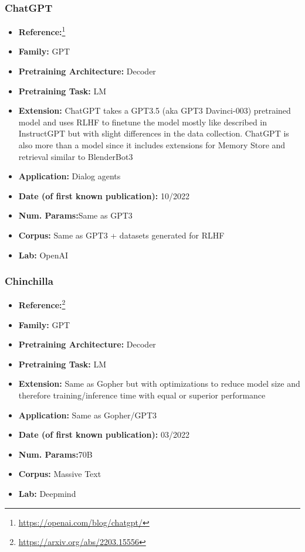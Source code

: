 \documentclass{article}
\begin{document}
\subsubsection{ChatGPT}

            \begin{itemize}
                \item \textbf{Reference:}\footnote{\url{https://openai.com/blog/chatgpt/}}
                \item \textbf{Family:} GPT 
                \item \textbf{Pretraining Architecture:} Decoder
                \item \textbf{Pretraining Task:} LM
                \item \textbf{Extension:} ChatGPT takes a GPT3.5 (aka GPT3 Davinci-003) pretrained model and uses RLHF to finetune the model mostly like described in InstructGPT but with slight differences in the data collection. ChatGPT is also more than a model since it includes extensions for Memory Store and retrieval similar to BlenderBot3  
                \item \textbf{Application:} Dialog agents
                \item \textbf{Date (of first known publication):} 10/2022
                \item \textbf{Num. Params:}Same as GPT3
                \item \textbf{Corpus:} Same as GPT3 + datasets generated for RLHF
                \item \textbf{Lab:} OpenAI
            \end{itemize}

\subsubsection{Chinchilla}

            \begin{itemize}
                \item \textbf{Reference:}\footnote{\url{https://arxiv.org/abs/2203.15556}}\cite{hoffmann2022training}
                \item \textbf{Family:} GPT 
                \item \textbf{Pretraining Architecture:} Decoder
                \item \textbf{Pretraining Task:} LM
                \item \textbf{Extension:} Same as Gopher but with optimizations to reduce model size and therefore training/inference time with equal or superior performance  
                \item \textbf{Application:} Same as Gopher/GPT3
                \item \textbf{Date (of first known publication):} 03/2022
                \item \textbf{Num. Params:}70B
                \item \textbf{Corpus:} Massive Text
                \item \textbf{Lab:} Deepmind
            \end{itemize}
\end{document}
